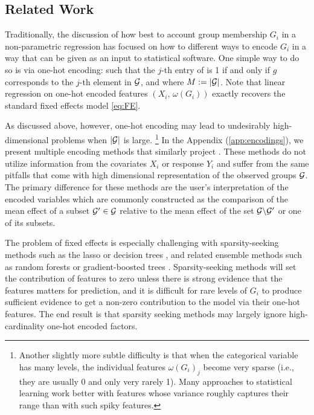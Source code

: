 \documentclass{article}
\theoremstyle{plain}
\theoremstyle{definition}
\theoremstyle{remark}
\begin{document}
\subsection{Related Work}
\label{subsec:related_work}

Traditionally, the discussion of how best to account group membership $G_i$ in a non-parametric regression
has focused on how to different ways to encode $G_i$ in a way that can be given as an input to
statistical software. One simple way to do so is via one-hot encoding:
 such that the $j$-th entry of 
is 1 if and only if $g$ corresponds to the $j$-th element in $\mathcal{G}$, and where $M := {\left\lvert\mathcal{G}\right\rvert}$. Note that linear regression on
one-hot encoded features $(X_i, \, \omega(G_i))$ exactly recovers the standard fixed effects model
\eqref{eq:FE}.

As discussed above, however, one-hot encoding may lead to undesirably high-dimensional problems
when $\left\lvert\mathcal{G}\right\rvert$ is large. \footnote{Another slightly more subtle difficulty is that when the categorical
variable has many levels, the individual features $\omega(G_i)_j$ become very sparse (i.e., they are usually
0 and only very rarely 1). Many approaches to statistical learning work better with features whose
variance roughly captures their range than with such spiky features.} In the Appendix (\ref{app:encodings}),
we present multiple encoding methods that similarly project .
These methods do not utilize information from the covariates $X_i$ or response $Y_i$ and suffer from the same pitfalls that
come with high dimensional representation of the observed groups $\mathcal{G}$. The primary difference for
these methods are the user's interpretation of the encoded variables which are commonly constructed as the comparison of
 the mean effect of a subset $\mathcal{G}' \in \mathcal{G}$ relative to the mean effect of the set $\mathcal{G} \backslash \mathcal{G}'$ or one of its subsets.


The problem of fixed effects is especially challenging with sparsity-seeking methods such as the
lasso \citep{hastie2015statistical} or decision trees \citep{breiman1984classification}, and related
ensemble methods such as random forests \citep{breiman2001random} or gradient-boosted
trees \citep{friedman2001greedy}. Sparsity-seeking methods will set the contribution of features
to zero unless there is strong evidence that the features matters for prediction, and it is difficult
for rare levels of $G_i$ to produce sufficient evidence to get a non-zero contribution to the model
via their one-hot features. The end result is that sparsity seeking methods may largely ignore high-cardinality
one-hot encoded factors.
\end{document}
